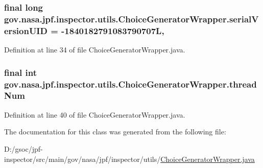 \subsubsection[{\texorpdfstring{serial\+Version\+U\+ID}{serialVersionUID}}]{\setlength{\rightskip}{0pt plus 5cm}final long gov.\+nasa.\+jpf.\+inspector.\+utils.\+Choice\+Generator\+Wrapper.\+serial\+Version\+U\+ID = -\/1840182791083790707L\hspace{0.3cm}{\ttfamily [static]}, {\ttfamily [private]}}\hypertarget{classgov_1_1nasa_1_1jpf_1_1inspector_1_1utils_1_1_choice_generator_wrapper_a74a23b94e17a7bd22f4d103fec7dc632}{}\label{classgov_1_1nasa_1_1jpf_1_1inspector_1_1utils_1_1_choice_generator_wrapper_a74a23b94e17a7bd22f4d103fec7dc632}


Definition at line 34 of file Choice\+Generator\+Wrapper.\+java.

\subsubsection[{\texorpdfstring{thread\+Num}{threadNum}}]{\setlength{\rightskip}{0pt plus 5cm}final int gov.\+nasa.\+jpf.\+inspector.\+utils.\+Choice\+Generator\+Wrapper.\+thread\+Num\hspace{0.3cm}{\ttfamily [private]}}\hypertarget{classgov_1_1nasa_1_1jpf_1_1inspector_1_1utils_1_1_choice_generator_wrapper_a81cb8b377c3934a700c27d479e9a822a}{}\label{classgov_1_1nasa_1_1jpf_1_1inspector_1_1utils_1_1_choice_generator_wrapper_a81cb8b377c3934a700c27d479e9a822a}


Definition at line 40 of file Choice\+Generator\+Wrapper.\+java.



The documentation for this class was generated from the following file\+:\begin{DoxyCompactItemize}
\item 
D\+:/gsoc/jpf-\/inspector/src/main/gov/nasa/jpf/inspector/utils/\hyperlink{_choice_generator_wrapper_8java}{Choice\+Generator\+Wrapper.\+java}\end{DoxyCompactItemize}
